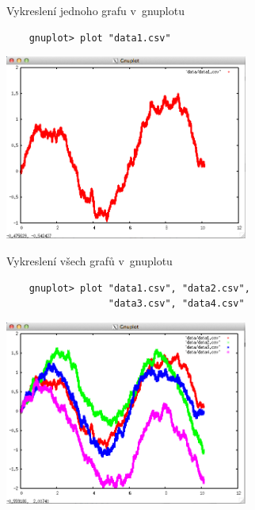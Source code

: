 \documentclass{beamer}
\begin{document}
\begin{frame}[fragile]{Vykreslení jednoho grafu v~gnuplotu}
  \begin{verbatim}
    gnuplot> plot "data1.csv"
  \end{verbatim}
  \pause
  \begin{center}
    \includegraphics[width=0.6\textwidth]{gnuplot_interactive}
  \end{center}
\end{frame}

\begin{frame}[fragile]{Vykreslení všech grafů v~gnuplotu}
  \begin{verbatim}
    gnuplot> plot "data1.csv", "data2.csv",
                  "data3.csv", "data4.csv"
  \end{verbatim}
  \pause
  \begin{center}
    \includegraphics[width=0.6\textwidth]{gnuplot_interactive_all}
  \end{center}
\end{frame}
\end{document}
